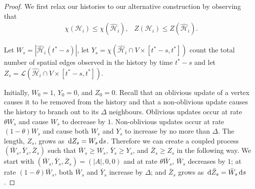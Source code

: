 	\begin{proof}
		We first relax our histories to our alternative construction by observing that
		\begin{align}
			&\chi(\mathcal{H}_i) \leq \chi(\hat{\mathcal{H}}_i), &Z(\mathcal{H}_i) \leq Z(\hat{\mathcal{H}}_i).
		\end{align}


		Let $W_s = |\hat{\mathcal{H}}_i (t^* - s)|$, let $Y_s = \chi(\hat{\mathcal{H}}_i \cap V \times [t^* - s, t^*])$ count the total number of spatial edges observed in the history by time $t^* - s$ and let $Z_s = \mathcal{L}(\hat{\mathcal{H}}_i \cap V \times [t^* - s, t^*])$. 

		Initially, $W_0 = 1$, $Y_0 = 0$, and $Z_0 = 0$. Recall that an oblivious update of a vertex causes it to be removed from the history and that a non-oblivious update causes the history to branch out to its $\Delta$ neighbours. Oblivious updates occur at rate $\theta W_s$ and cause $W_s$ to decrease by $1$. Non-oblivious updates occur at rate $(1 - \theta)W_s$ and cause both $W_s$ and $Y_s$ to increase by no more than $\Delta$. The length, $Z_s$, grows as $\, \mathrm{d} Z_s = W_s \, \mathrm{d} s$. Therefore we can create a coupled process $(\bar{W}_s, \bar{Y}_s, \bar{Z}_s)$ such that $\bar{W}_s \geq W_s$, $\bar{Y}_s \geq Y_s$, and $\bar{Z}_s \geq Z_s$ in the following way. We start with $(\bar{W}_s, \bar{Y}_s, \bar{Z}_s) = (|A|, 0, 0)$ and at rate $\theta \bar{W}_s$, $\bar{W}_s$ decreases by $1$; at rate $(1 - \theta)\bar{W}_s$, both $\bar{W}_s$ and $\bar{Y}_s$ increase by $\Delta$; and $\bar{Z}_s$ grows as $\, \mathrm{d} \bar{Z}_s = \bar{W}_s \, \mathrm{d} s$.


\end{proof}

